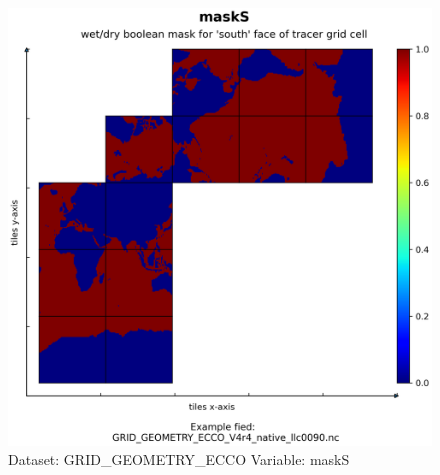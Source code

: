 \begin{figure}[H]
\centering
\includegraphics[scale=0.55]{../images/plots/native_plots_coords/Geometry_Parameters_for_the_Lat-Lon-Cap_90_(llc90)_Native_Model_Grid_(Version_4_Release_4)/maskS.png}
\caption{Dataset: GRID\_GEOMETRY\_ECCO Variable: maskS}
\label{tab:table-GRID_GEOMETRY_ECCO_maskS-Plot}
\end{figure}